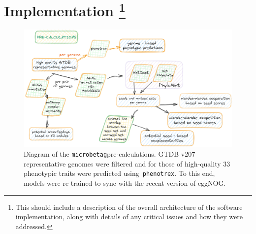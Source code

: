 \documentclass[sn-mathphys,Numbered]{sn-jnl}  %
\theoremstyle{thmstyleone}%
\theoremstyle{thmstyletwo}%
\theoremstyle{thmstylethree}%
\newcommand{\microbetag}{\texttt{microbetag}}
\begin{document}


 
\section*{Implementation
    \footnote{
        This should include a description of the overall architecture of the software implementation, along with details of any critical issues and how they were addressed.
    }
}
\label{sec:implementation}


    \begin{figure}[h!]
        \label{fig:precalc}
        \includegraphics[width=0.9\columnwidth]{figs/microbetag-precal.png}
        \caption{
            Diagram of the \microbetag pre-calculations.
            GTDB v207 representative genomes were filtered and for those of high-quality
            33 phenotypic traits were predicted using~\texttt{phenotrex}.
            To this end, models were re-trained to sync with the recent version of eggNOG.
        }
    \end{figure}
\end{document}
